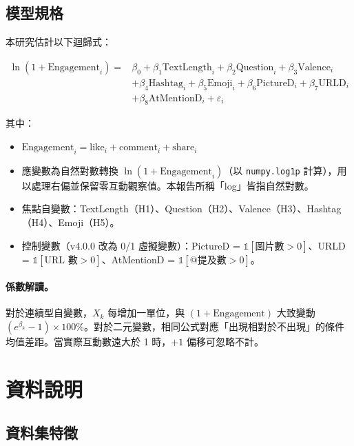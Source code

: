 \documentclass[12pt,a4paper]{ctexart}
\begin{document}
\subsection{模型規格}

本研究估計以下迴歸式：

\begin{equation}
\begin{aligned}
\ln(1 + \text{Engagement}_i) = {}& \beta_0 + \beta_1\text{TextLength}_i + \beta_2\text{Question}_i + \beta_3\text{Valence}_i \\
& + \beta_4\text{Hashtag}_i + \beta_5\text{Emoji}_i + \beta_6\text{PictureD}_i + \beta_7\text{URLD}_i \\
& + \beta_8\text{AtMentionD}_i + \varepsilon_i
\end{aligned}
\end{equation}

其中：
\begin{itemize}
    \item $\text{Engagement}_i = \text{like}_i + \text{comment}_i + \text{share}_i$
    \item 應變數為自然對數轉換 $\ln(1 + \text{Engagement}_i)$（以 \texttt{numpy.log1p} 計算），用以處理右偏並保留零互動觀察值。本報告所稱「log」皆指自然對數。
    \item 焦點自變數：TextLength（H1）、Question（H2）、Valence（H3）、Hashtag（H4）、Emoji（H5）。
    \item 控制變數（v4.0.0 改為 0/1 虛擬變數）：PictureD = $\mathbb{1}[\text{圖片數}>0]$、URLD = $\mathbb{1}[\text{URL 數}>0]$、AtMentionD = $\mathbb{1}[\text{@提及數}>0]$。
\end{itemize}

\paragraph{係數解讀。}對於連續型自變數，$X_k$ 每增加一單位，與 $(1+\text{Engagement})$ 大致變動 $(e^{\beta_k}-1)\times 100\%$。對於二元變數，相同公式對應「出現相對於不出現」的條件均值差距。當實際互動數遠大於 1 時，$+1$ 偏移可忽略不計。

\section{資料說明}

\subsection{資料集特徵}
\end{document}
